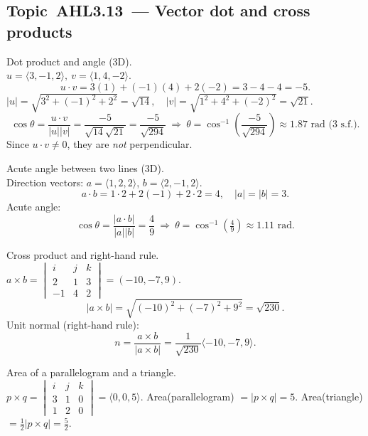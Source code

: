 \documentclass[11pt]{article}
\def\textbf#1{#1}%
\def\mathbf#1{#1}%
\newcommand{\tocsubsection}[1]{\subsection{#1}}
\begin{document}
\tocsubsection{Topic AHL3.13 — Vector dot and cross products}


\begin{solution}
\textbf{Dot product and angle (3D).}\\
\(\mathbf{u}=\langle3,-1,2\rangle,\ \mathbf{v}=\langle1,4,-2\rangle\).
\[
\mathbf{u}\!\cdot\!\mathbf{v}=3(1)+(-1)(4)+2(-2)=3-4-4=-5.
\]
\(|\mathbf{u}|=\sqrt{3^2+(-1)^2+2^2}=\sqrt{14},\quad
 |\mathbf{v}|=\sqrt{1^2+4^2+(-2)^2}=\sqrt{21}.\)
\[
\cos\theta=\frac{\mathbf{u}\cdot\mathbf{v}}{|\mathbf{u}||\mathbf{v}|}
=\frac{-5}{\sqrt{14}\sqrt{21}}=\frac{-5}{\sqrt{294}}
\ \Rightarrow\ 
\theta=\cos^{-1}\!\!\left(\frac{-5}{\sqrt{294}}\right)\approx1.87\text{ rad (3 s.f.)}.
\]
Since \(\mathbf{u}\cdot\mathbf{v}\neq0\), they are \emph{not} perpendicular.
\end{solution}

\begin{solution}
\textbf{Acute angle between two lines (3D).}\\
Direction vectors: \(\mathbf{a}=\langle1,2,2\rangle\), \(\mathbf{b}=\langle2,-1,2\rangle\).
\[
\mathbf{a}\cdot\mathbf{b}=1\cdot2+2(-1)+2\cdot2=4,\quad
|\mathbf{a}|=|\mathbf{b}|=3.
\]
Acute angle:
\[
\cos\theta=\frac{|\mathbf{a}\cdot\mathbf{b}|}{|\mathbf{a}||\mathbf{b}|}=\frac{4}{9}
\ \Rightarrow\ 
\theta=\cos^{-1}\!\left(\tfrac{4}{9}\right)\approx1.11\text{ rad}.
\]
\end{solution}

\begin{solution}
\textbf{Cross product and right-hand rule.}\\
\(\mathbf{a}\times\mathbf{b}=
\begin{vmatrix}
\mathbf{i}&\mathbf{j}&\mathbf{k}\\[2pt]
2&1&3\\
-1&4&2
\end{vmatrix}
=(-10,-7,9).\)
\[
|\mathbf{a}\times\mathbf{b}|=\sqrt{(-10)^2+(-7)^2+9^2}=\sqrt{230}.
\]
Unit normal (right-hand rule):
\[
\mathbf{n}=\frac{\mathbf{a}\times\mathbf{b}}{|\mathbf{a}\times\mathbf{b}|}
=\frac{1}{\sqrt{230}}\langle-10,-7,9\rangle.
\]
\end{solution}

\begin{solution}
\textbf{Area of a parallelogram and a triangle.}\\
\(\mathbf{p}\times\mathbf{q}=
\begin{vmatrix}
\mathbf{i}&\mathbf{j}&\mathbf{k}\\[2pt]
3&1&0\\
1&2&0
\end{vmatrix}
=\langle0,0,5\rangle.\)
Area(parallelogram) \(=|\mathbf{p}\times\mathbf{q}|=5\).  
Area(triangle) \(=\tfrac12|\mathbf{p}\times\mathbf{q}|=\tfrac{5}{2}\).
\end{solution}
\end{document}
